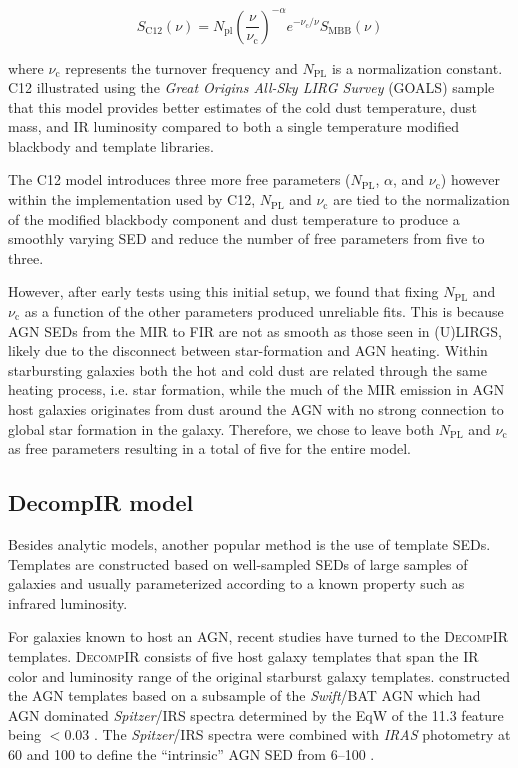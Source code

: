 \documentclass[fleqn, usenatbib]{mnras}
\newcommand{\swift}{\textit{Swift}}
\begin{document}
\begin{equation}\label{eq:casey}
S_{\mathrm{C12}}(\nu) = N_{\mathrm{pl}}\left(\frac{\nu}{\nu_{\mathrm{c}}}\right)^{-\alpha}e^{-\nu_{\mathrm{c}}/\nu}S_{\mathrm{MBB}}(\nu)
\end{equation}

\noindent where $\nu_{\mathrm{c}}$ represents the turnover frequency and $N_{\mathrm{PL}}$ is a normalization constant. C12 illustrated using the \textit{Great Origins All-Sky LIRG Survey} (GOALS) sample that this model provides better estimates of the cold dust temperature, dust mass, and IR luminosity compared to both a single temperature modified blackbody and template libraries.

The C12 model introduces three more free parameters ($N_{\mathrm{PL}}$, $\alpha$, and $\nu_{\mathrm{c}}$) however within the implementation used by C12, $N_{\mathrm{PL}}$ and $\nu_{\mathrm{c}}$ are tied to the normalization of the modified blackbody component and dust temperature to produce a smoothly varying SED and reduce the number of free parameters from five to three. 

However, after early tests using this initial setup, we found that fixing $N_{\mathrm{PL}}$ and $\nu_{\mathrm{c}}$ as a function of the other parameters produced unreliable fits. This is because AGN SEDs from the MIR to FIR are not as smooth as those seen in (U)LIRGS, likely due to the disconnect between star-formation and AGN heating. Within starbursting galaxies both the hot and cold dust are related through the same heating process, i.e. star formation, while the much of the MIR emission in AGN host galaxies originates from dust around the AGN with no strong connection to global star formation in the galaxy. Therefore, we chose to leave both $N_{\mathrm{PL}}$ and $\nu_{\mathrm{c}}$ as free parameters resulting in a total of five for the entire model.

\subsection{DecompIR model}
Besides analytic models, another popular method is the use of template SEDs. Templates are constructed based on well-sampled SEDs of large samples of galaxies and usually parameterized according to a known property such as infrared luminosity.

For galaxies known to host an AGN, recent studies have turned to the \textsc{DecompIR} \citep{Mullaney:2011yq} templates. \textsc{DecompIR} consists of five host galaxy templates that span the IR color and luminosity range of the original \citet{Brandl:2006kx} starburst galaxy templates. \citet{Mullaney:2011yq} constructed the AGN templates based on a subsample of the \swift/BAT AGN which had AGN dominated \textit{Spitzer}/IRS spectra determined by the EqW of the 11.3 \micron{} feature being $<0.03$ \micron. The \textit{Spitzer}/IRS spectra were combined with \textit{IRAS} photometry at 60 and 100 \micron to define the ``intrinsic'' AGN SED from 6--100 \micron. 
\end{document}

